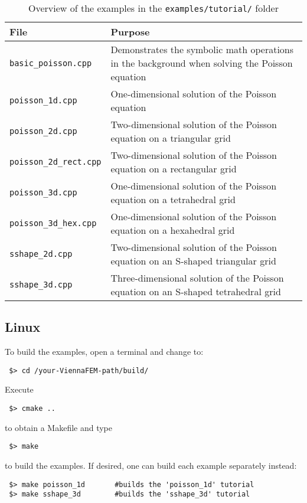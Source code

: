 \begin{table}[tb]
\begin{center}
\begin{tabular}{l|p{9.5cm}}
File & Purpose\\
\hline
\texttt{basic\_poisson.cpp}           & Demonstrates the symbolic math operations in the background when solving the Poisson equation \\
\texttt{poisson\_1d.cpp}              & One-dimensional solution of the Poisson equation \\
\texttt{poisson\_2d.cpp}              & Two-dimensional solution of the Poisson equation on a triangular grid\\
\texttt{poisson\_2d\_rect.cpp}        & Two-dimensional solution of the Poisson equation on a rectangular grid\\
\texttt{poisson\_3d.cpp}              & One-dimensional solution of the Poisson equation on a tetrahedral grid\\
\texttt{poisson\_3d\_hex.cpp}         & One-dimensional solution of the Poisson equation on a hexahedral grid\\
\texttt{sshape\_2d.cpp}               & Two-dimensional solution of the Poisson equation on an S-shaped triangular grid\\
\texttt{sshape\_3d.cpp}               & Three-dimensional solution of the Poisson equation on an S-shaped tetrahedral grid\\
\end{tabular}
\caption{Overview of the examples in the \texttt{examples/tutorial/} folder}
\label{tab:tutorial-dependencies}
\end{center}
\end{table}

\subsection{Linux}
To build the examples, open a terminal and change to:

\begin{lstlisting}
 $> cd /your-ViennaFEM-path/build/
\end{lstlisting}
Execute
\begin{lstlisting}
 $> cmake ..
\end{lstlisting}
to obtain a Makefile and type
\begin{lstlisting}
 $> make 
\end{lstlisting}
to build the examples. If desired, one can build each example separately instead:
\begin{lstlisting}
 $> make poisson_1d       #builds the 'poisson_1d' tutorial
 $> make sshape_3d        #builds the 'sshape_3d' tutorial
\end{lstlisting}


